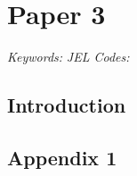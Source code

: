 \chapter{Paper 3}

\begin{abstract}
\end{abstract}

\noindent   \textit{Keywords:}      \newline
            \textit{JEL Codes:}



\pagebreak
\section{Introduction}


\pagebreak




\pagebreak
\begin{subappendices}

\section{Appendix 1}

\end{subappendices}